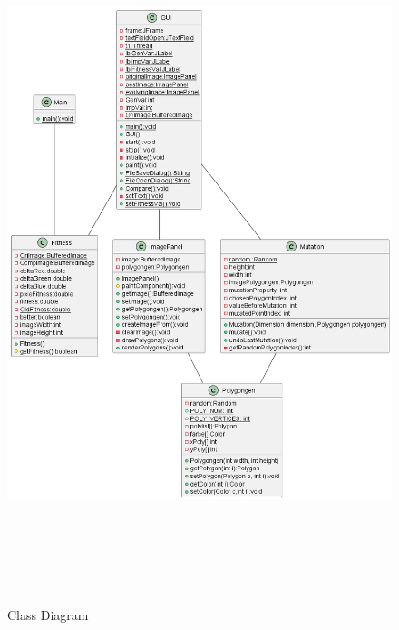 \begin{figure}
\centering
\includegraphics[width=6.3in,height=8in]{images/image12.png}
\caption{Class Diagram}
\end{figure}
\clearpage


